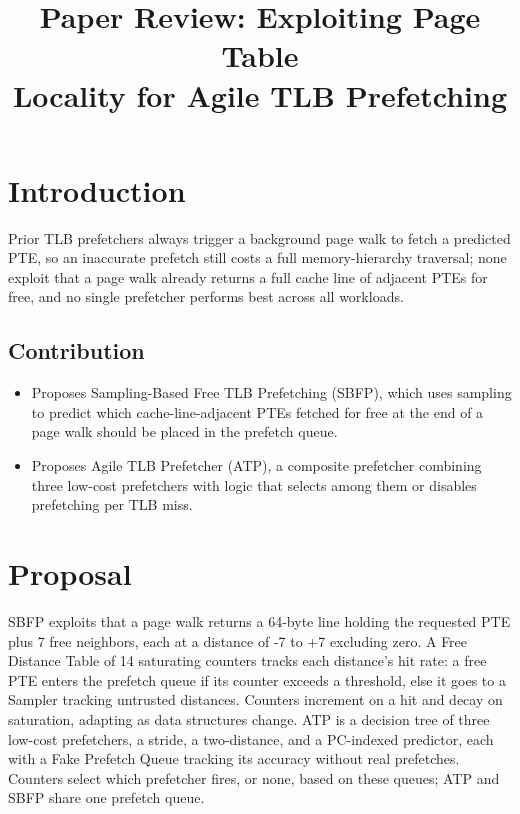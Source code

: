 \documentclass[10pt, conference]{IEEEtran}
\begin{document}
\title{\Large\bfseries Paper Review: Exploiting Page Table\\Locality for Agile TLB Prefetching}

\author{
}

\maketitle

\section{Introduction}
Prior TLB prefetchers always trigger a background page walk to fetch a predicted PTE, so an inaccurate prefetch still costs a full memory-hierarchy traversal; none exploit that a page walk already returns a full cache line of adjacent PTEs for free, and no single prefetcher performs best across all workloads.

\subsection{Contribution}
\begin{itemize}[leftmargin=*, itemsep=2pt, topsep=2pt, parsep=1pt]
    \item Proposes Sampling-Based Free TLB Prefetching (SBFP), which uses sampling to predict which cache-line-adjacent PTEs fetched for free at the end of a page walk should be placed in the prefetch queue.
    \item Proposes Agile TLB Prefetcher (ATP), a composite prefetcher combining three low-cost prefetchers with logic that selects among them or disables prefetching per TLB miss.
\end{itemize}

\section{Proposal}
SBFP exploits that a page walk returns a 64-byte line holding the requested PTE plus 7 free neighbors, each at a distance of -7 to +7 excluding zero. A Free Distance Table of 14 saturating counters tracks each distance's hit rate: a free PTE enters the prefetch queue if its counter exceeds a threshold, else it goes to a Sampler tracking untrusted distances. Counters increment on a hit and decay on saturation, adapting as data structures change. ATP is a decision tree of three low-cost prefetchers, a stride, a two-distance, and a PC-indexed predictor, each with a Fake Prefetch Queue tracking its accuracy without real prefetches. Counters select which prefetcher fires, or none, based on these queues; ATP and SBFP share one prefetch queue.
\end{document}
